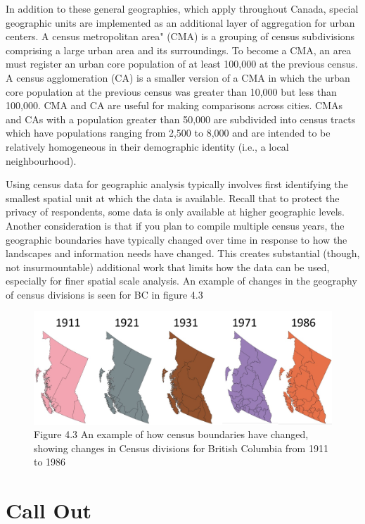 \documentclass[
]{book}
\begin{document}
In addition to these general geographies, which apply throughout Canada, special geographic units are implemented as an additional layer of aggregation for urban centers. A census metropolitan area" (CMA) is a grouping of census subdivisions comprising a large urban area and its surroundings. To become a CMA, an area must register an urban core population of at least 100,000 at the previous census. A census agglomeration (CA) is a smaller version of a CMA in which the urban core population at the previous census was greater than 10,000 but less than 100,000. CMA and CA are useful for making comparisons across cities. CMAs and CAs with a population greater than 50,000 are subdivided into census tracts which have populations ranging from 2,500 to 8,000 and are intended to be relatively homogeneous in their demographic identity (i.e., a local neighbourhood).

Using census data for geographic analysis typically involves first identifying the smallest spatial unit at which the data is available. Recall that to protect the privacy of respondents, some data is only available at higher geographic levels. Another consideration is that if you plan to compile multiple census years, the geographic boundaries have typically changed over time in response to how the landscapes and information needs have changed. This creates substantial (though, not insurmountable) additional work that limits how the data can be used, especially for finer spatial scale analysis. An example of changes in the geography of census divisions is seen for BC in figure 4.3

\begin{figure}
\centering
\includegraphics{images/04-shifting-census-boundaries.png}
\caption{Figure 4.3 An example of how census boundaries have changed, showing changes in Census divisions for British Columbia from 1911 to 1986}
\end{figure}

\hypertarget{call-out-1}{%
\section*{Call Out}\label{call-out-1}}
\end{document}
